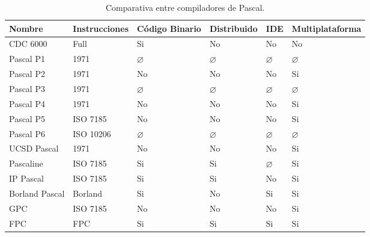 \begin{table}[h]

\begin{center}

\begin{tabular}{|l|l|l|l|l|l|}\hline
\textbf{Nombre} & \textbf{Instrucciones} & \textbf{Código Binario} & \textbf{Distribuido} & \textbf{IDE}  & \textbf{Multiplataforma} \\ \hline
\hline
CDC 6000 & Full & Si & No & No & No \\ \hline
Pascal P1 & 1971  & $\varnothing$ & $\varnothing$ & $\varnothing$ & $\varnothing$ \\ \hline
Pascal P2 & 1971 & No & No & No & Si \\ \hline
Pascal P3 & 1971  & $\varnothing$ & $\varnothing$ & $\varnothing$ & $\varnothing$ \\ \hline
Pascal P4 & 1971 & No & No & No & Si \\ \hline
Pascal P5 & ISO 7185 & No & No & No & Si \\ \hline
Pascal P6 & ISO 10206  & $\varnothing$ & $\varnothing$ & $\varnothing$ & $\varnothing$ \\ \hline
UCSD Pascal & 1971 & No & No & No & Si \\ \hline
Pascaline & ISO 7185 & Si & Si & $\varnothing$ & Si \\ \hline
IP Pascal & ISO 7185 & Si & Si & No & Si \\ \hline
Borland Pascal & Borland & Si & No & Si & Si \\ \hline
GPC & ISO 7185 & No  & No & No & Si \\ \hline
FPC & FPC & Si & Si & Si & Si \\ \hline
\end{tabular}

\caption{Comparativa entre compiladores de Pascal.}

\end{center}

\end{table}